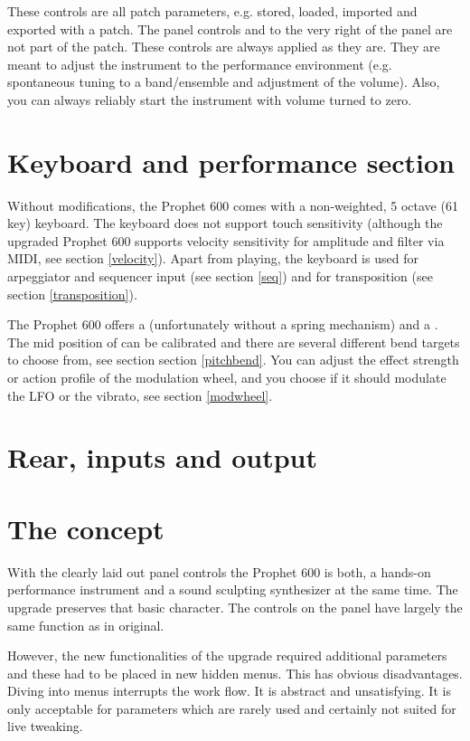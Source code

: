 \documentclass[landscape, 11pt, oneside]{report}
\newenvironment{flowtext}{\addmargin[0cm]{7cm}}{\endaddmargin} %
\begin{document}
\begin{flowtext}
These controls are all patch parameters, e.g. stored, loaded, imported and exported with a patch. The panel controls \mastertune and \mastervol to the very right of the panel are not part of the patch. These controls are always applied as they are. They are meant to adjust the instrument to the performance environment (e.g. spontaneous tuning to a band/ensemble and adjustment of the volume). Also, you can always reliably start the instrument with volume turned to zero.

\section{Keyboard and performance section}

Without modifications, the Prophet 600 comes with a non-weighted, 5 octave (61 key) keyboard. The keyboard does not support touch sensitivity (although the upgraded Prophet 600 supports velocity sensitivity for amplitude and filter via MIDI, see section \ref{velocity}). Apart from playing, the keyboard is used for arpeggiator and sequencer input (see section \ref{seq}) and for transposition (see section \ref{transposition}). 

The Prophet 600 offers a \pitchbender (unfortunately without a spring mechanism) and a \modwheel. The mid position of \pitchbender can be calibrated and there are several different bend targets to choose from, see section section \ref{pitchbend}. You can adjust the effect strength or action profile of the modulation wheel, and you choose if it should modulate the LFO or the vibrato, see section \ref{modwheel}.

\section{Rear, inputs and output}



\section{The concept}

With the clearly laid out panel controls the Prophet 600 is both, a hands-on performance instrument and a sound sculpting synthesizer at the same time. The upgrade preserves that basic character. The controls on the panel have largely the same function as in original. 

However, the new functionalities of the upgrade required additional parameters and these had to be placed in new hidden menus. This has obvious disadvantages. Diving into menus interrupts the work flow. It is abstract and unsatisfying. It is only acceptable for parameters which are rarely used and certainly not suited for live tweaking. 


\end{flowtext}
\end{document}
